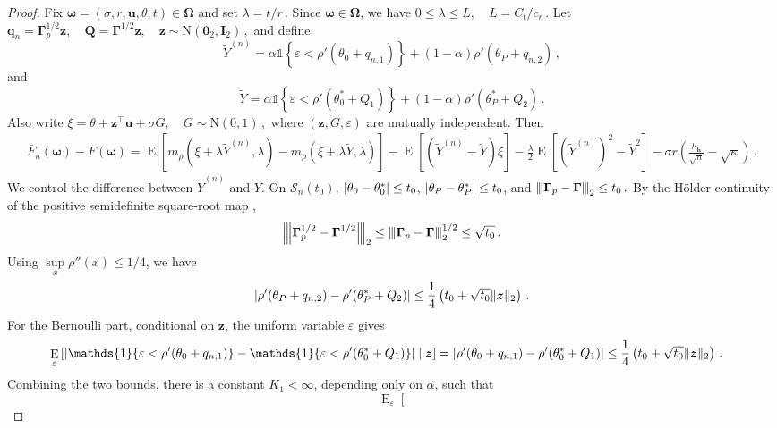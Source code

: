 \documentclass{article}
\makeatletter
\DeclareMathOperator{\expect}{E}
\theoremstyle{definition}
\newcommand{\vnorm}[1]{%
	\ensuremath{%
		\if@display
		\left\| #1 \right\|
		\else
		\| #1 \|
		\fi
	}%
}
\newcommand{\abs}[1]{%
	\ensuremath{%
		\if@display
		\left| #1 \right|
		\else
		\lvert #1 \rvert
		\fi
	}%
}
\newcommand{\mnorm}[1]{{\left\vert\kern-0.25ex\left\vert\kern-0.25ex\left\vert #1
		\right\vert\kern-0.25ex\right\vert\kern-0.25ex\right\vert}}
\newcommand*{\bb}{\boldsymbol}
\def\bu{\bb{u}}
\def\bh{\bb{h}}
\def\Ytil{\widetilde{Y}}
\def\bz{\bb{z}}
\makeatother
\begin{document}
\begin{bibunit}
\begin{proof}
		Fix $\bb\omega=(\sigma,r,\bu,\theta,t)\in\bb\Omega$
		and set $\lambda=t/r\,.$
		Since $\bb\omega\in\bb\Omega$, we have $0\leq \lambda\leq L, \quad L=C_t/c_r\,.$
		Let $\bb q_n=\bb\Gamma_p^{1/2}\bz, \quad \bb Q=\bb\Gamma^{1/2}\bz, \quad \bz\sim\mathrm N(\bb0_2,\bb I_2)\,,$
	and define
	$$
		\Ytil^{(n)}
		=
		\alpha\mathds{1}
		\left\{
			\varepsilon<\rho'(\theta_0+q_{n,1})
		\right\}
		+
		(1-\alpha)\rho'(\theta_P+q_{n,2})\,,
	$$
	and
	$$
		\Ytil
		=
		\alpha\mathds{1}
		\left\{
			\varepsilon<\rho'(\theta_0^*+Q_1)
		\right\}
		+
		(1-\alpha)\rho'(\theta_P^*+Q_2) \,.
	$$
		Also write $\xi=\theta+\bz^\top\bu+\sigma G, \quad G\sim\mathrm N(0,1)\,,$
	where $(\bz,G,\varepsilon)$ are mutually independent. Then
	$$
		\begin{aligned}
		\bar F_n(\bb\omega)-F(\bb\omega)
		=
		\expect\left[
			m_\rho(\xi+\lambda \Ytil^{(n)},\lambda)
			-
			m_\rho(\xi+\lambda \Ytil,\lambda)
		\right]
		-
		\expect\left[
			(\Ytil^{(n)}-\Ytil)\xi
		\right]
		-
		\frac{\lambda}{2}
		\expect\left[
			(\Ytil^{(n)})^2-\Ytil^2
		\right]
		-
		\sigma r
		\left(
			\frac{\mu_{\bh}}{\sqrt n}
			-
			\sqrt\kappa
		\right) \,.
		\end{aligned}
	$$
	We control the difference between $\Ytil^{(n)}$ and $\Ytil$. On $\mathcal S_n(t_0)$, $\abs{\theta_0-\theta_0^*}\leq t_0$, $\abs{\theta_P-\theta_P^*}\leq t_0$, and $\mnorm{\bb\Gamma_p-\bb\Gamma}_2\leq t_0\,.$
	By the H\"older continuity of the positive semidefinite square-root map
		\citep[][Theorem~X.1.1]{bhatia:1997},
	$$
		\mnorm{\bb\Gamma_p^{1/2}-\bb\Gamma^{1/2}}_2
		\leq
		\mnorm{\bb\Gamma_p-\bb\Gamma}_2^{1/2}
		\leq
		\sqrt{t_0} \,.
	$$
	Using $\underset{x}{\sup}\rho''(x)\leq 1/4$, we have
	$$
		\abs{
			\rho'(\theta_P+q_{n,2})
			-
			\rho'(\theta_P^*+Q_2)
		}
		\leq
		\frac14
		\left(
			t_0
			+
			\sqrt{t_0}\vnorm{\bz}_2
		\right) \,.
	$$
	For the Bernoulli part, conditional on $\bz$, the uniform variable $\varepsilon$ gives
	$$
		\begin{aligned}
		&\expect_\varepsilon
		\left[
			\abs{
				\mathds{1}\{
					\varepsilon<\rho'(\theta_0+q_{n,1})
				\}
				-
				\mathds{1}\{
					\varepsilon<\rho'(\theta_0^*+Q_1)
				\}
			}
			\mid \bz
		\right]=
		\abs{
			\rho'(\theta_0+q_{n,1})
			-
			\rho'(\theta_0^*+Q_1)
		}\leq
		\frac14
		\left(
			t_0
			+
			\sqrt{t_0}\vnorm{\bz}_2
		\right) \,.
		\end{aligned}
	$$
	Combining the two bounds, there is a constant $K_1<\infty$, depending only on $\alpha$, such that
	$$
		\expect_\varepsilon \left[
$$
\end{proof}
\end{bibunit}
\end{document}
